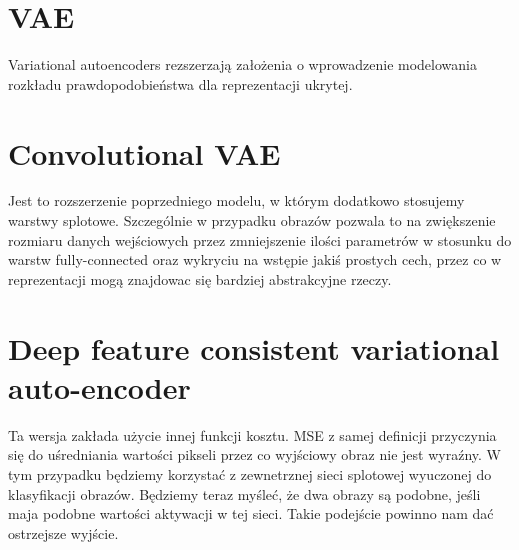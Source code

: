 \section{VAE}

Variational autoencoders rezszerzają założenia o wprowadzenie modelowania rozkładu prawdopodobieństwa dla reprezentacji ukrytej. 

\section{Convolutional VAE}

Jest to rozszerzenie poprzedniego modelu, w którym dodatkowo stosujemy warstwy splotowe. Szczególnie w przypadku obrazów pozwala to na zwiększenie rozmiaru danych wejściowych przez zmniejszenie ilości parametrów w stosunku do warstw fully-connected oraz wykryciu na wstępie jakiś prostych cech, przez co w reprezentacji mogą znajdowac się bardziej abstrakcyjne rzeczy. 

\section{Deep feature consistent variational auto-encoder}

Ta wersja zakłada użycie innej funkcji kosztu. MSE z samej definicji przyczynia się do uśredniania wartości pikseli przez co wyjściowy obraz nie jest wyraźny. W tym przypadku będziemy korzystać z zewnetrznej sieci splotowej wyuczonej do klasyfikacji obrazów. Będziemy teraz myśleć, że dwa obrazy są podobne, jeśli maja podobne wartości aktywacji w tej sieci. Takie podejście powinno nam dać ostrzejsze wyjście.
